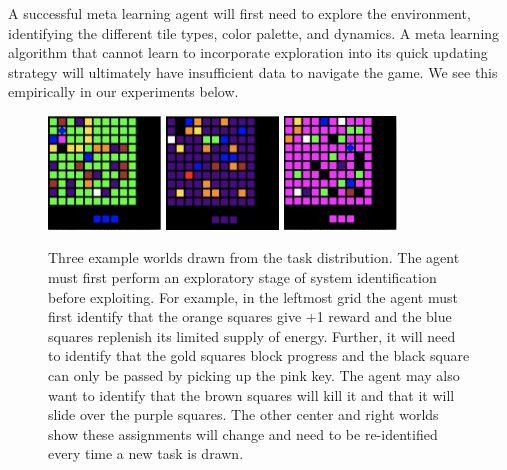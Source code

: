 \documentclass{article} %
\begin{document}
    A successful meta learning agent will first need to explore the environment, identifying the different tile types, color palette, and dynamics. A meta learning algorithm that cannot learn to incorporate exploration into its quick updating strategy will ultimately have insufficient data to navigate the game. We see this empirically in our experiments below. 
    
\begin{figure}[H]
\begin{center}
\includegraphics[width=30mm]{envs/grid_0.png}\hfill
\includegraphics[width=30mm]{envs/grid_1.png}\hfill
\includegraphics[width=30mm ]{envs/grid_2.png} 
\end{center}
\caption{Three example worlds drawn from the task distribution. The agent must first perform an exploratory stage of system identification before exploiting. For example, in the leftmost grid the agent must first identify that the orange squares give +1 reward and the blue squares replenish its limited supply of energy. Further, it will need to identify that the gold squares block progress and the black square can only be passed by picking up the pink key. The agent may also want to identify that the brown squares will kill it and that it will slide over the purple squares. The other center and right worlds show these assignments will change and need to be re-identified every time a new task is drawn.} %
\end{figure} 
\end{document}
